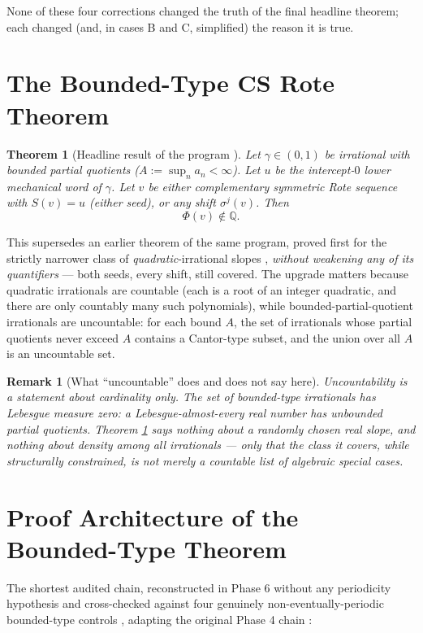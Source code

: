 \documentclass[11pt]{article}
\newtheorem{theorem}{Theorem}[section]
\newtheorem*{remark}{Remark}
\newcommand{\Q}{\mathbb{Q}}
\begin{document}
None of these four corrections changed the truth of the final headline theorem; each changed (and, in cases B and C, simplified) the reason it is true.

\section{The Bounded-Type CS Rote Theorem}
\label{sec:boundedtype}

\begin{theorem}[Headline result of the program \cite{Phase6Bounded}]
\label{thm:boundedtype}
Let $\gamma\in(0,1)$ be irrational with bounded partial quotients ($A:=\sup_n a_n<\infty$). Let $u$ be the intercept-$0$ lower mechanical word of $\gamma$. Let $v$ be either complementary symmetric Rote sequence with $S(v)=u$ (either seed), or any shift $\sigma^j(v)$. Then
\[
\Phi(v)\notin\Q.
\]
\end{theorem}

This supersedes an earlier theorem of the same program, proved first for the strictly narrower class of \emph{quadratic}-irrational slopes \cite{Phase4Quadratic}, \emph{without weakening any of its quantifiers} --- both seeds, every shift, still covered. The upgrade matters because quadratic irrationals are countable (each is a root of an integer quadratic, and there are only countably many such polynomials), while bounded-partial-quotient irrationals are uncountable: for each bound $A$, the set of irrationals whose partial quotients never exceed $A$ contains a Cantor-type subset, and the union over all $A$ is an uncountable set.

\begin{remark}[What ``uncountable'' does and does not say here]
Uncountability is a statement about cardinality only. The set of bounded-type irrationals has Lebesgue measure zero: a Lebesgue-almost-every real number has \emph{unbounded} partial quotients. Theorem \ref{thm:boundedtype} says nothing about a randomly chosen real slope, and nothing about density among all irrationals --- only that the class it covers, while structurally constrained, is not merely a countable list of algebraic special cases.
\end{remark}

\section{Proof Architecture of the Bounded-Type Theorem}
\label{sec:architecture}

The shortest audited chain, reconstructed in Phase 6 without any periodicity hypothesis and cross-checked against four genuinely non-eventually-periodic bounded-type controls \cite{Phase6Arrow}, adapting the original Phase 4 chain \cite{Phase4Chain}:
\end{document}
